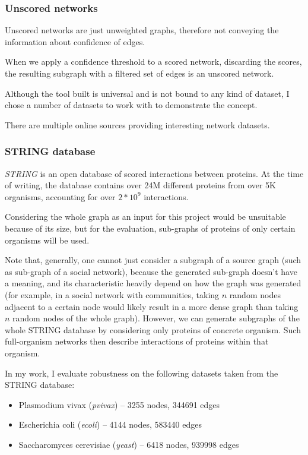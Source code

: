 \subsubsection{Unscored networks}

Unscored networks are just unweighted graphs, therefore not conveying the information about confidence of edges.

When we apply a confidence threshold to a scored network, discarding the scores, the resulting subgraph with a filtered set of edges is an unscored network.

\parspace

Although the \graffs tool built is universal and is not bound to any kind of dataset, I chose a number of datasets to work with to demonstrate the concept.

There are multiple online sources providing interesting network datasets.

\subsubsection{STRING database}

\textit{STRING}\cite{Szklarczyk2019} is an open database of scored interactions between proteins.
At the time of writing, the database contains over 24M different proteins from over 5K organisms, accounting for over $2 * 10^9$ interactions.

Considering the whole graph as an input for this project would be unsuitable because of its size, but for the evaluation, sub-graphs of proteins of only certain organisms will be used.

Note that, generally, one cannot just consider a subgraph of a source graph (such as sub-graph of a social network), because the generated sub-graph doesn't have a meaning, and its characteristic heavily depend on how the graph was generated (for example, in a social network with communities, taking $n$ random nodes adjacent to a certain node would likely result in a more dense graph than taking $n$ random nodes of the whole graph).
However, we can generate subgraphs of the whole STRING database by considering only proteins of concrete organism.
Such full-organism networks then describe interactions of proteins within that organism.

In my work, I evaluate robustness on the following datasets taken from the STRING database:
\begin{itemize}
    \item Plasmodium vivax (\textsl{pvivax}) -- 3255 nodes, 344691 edges
    \item Escherichia coli (\textsl{ecoli}) -- 4144 nodes, 583440 edges
    \item Saccharomyces cerevisiae (\textsl{yeast}) -- 6418 nodes, 939998 edges
\end{itemize}

